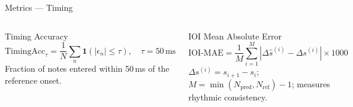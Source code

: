 \documentclass[aspectratio=169,9pt]{beamer}
\newcommand{\sh}{\hat{s}}
\begin{document}
\begin{frame}{Metrics --- Timing}
\begin{columns}[T]
      \begin{block}{Timing Accuracy}
        \[
          \mathrm{TimingAcc}_\tau
            = \frac{1}{N}\sum_n\mathbf{1}(|\epsilon_n|\le\tau),
            \quad\tau=50\,\text{ms}
        \]
        \footnotesize Fraction of notes entered within 50\,ms of the reference onset.
      \end{block}
      \medskip
      \begin{block}{IOI Mean Absolute Error}
        \[
          \mathrm{IOI\text{-}MAE}
            = \frac{1}{M}\sum_{i=1}^{M}|\Delta\sh^{(i)}-\Delta s^{(i)}|\times 1000
        \]
        \footnotesize $\Delta s^{(i)}\!=\!s_{i+1}\!-\!s_i$;\;
        $M\!=\!\min(N_\text{pred},N_\text{ref})\!-\!1$;\; measures rhythmic consistency.
      \end{block}
  \end{columns}
\end{frame}
\end{document}
